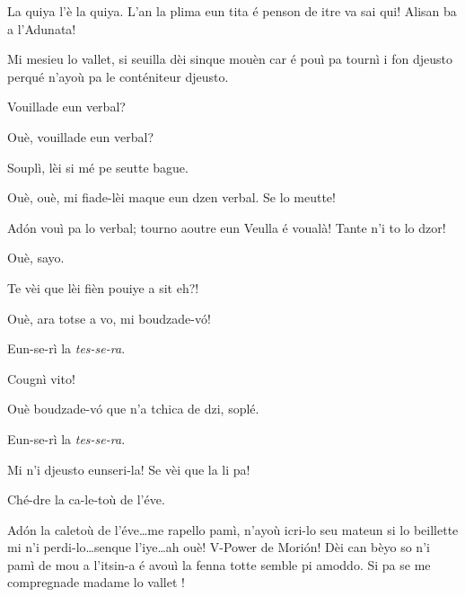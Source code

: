 \begin{drama}

\Prosperospeaks{} La quiya l'è la quiya.  L'an la plima eun tita é penson de itre va sai qui! Alisan ba a l'Adunata!

\Pierluigispeaks Mi mesieu lo vallet, si seuilla dèi sinque mouèn car é pouì pa tournì i fon djeusto perqué n'ayoù pa le conténiteur djeusto.

\Valletspeaks Vouillade eun verbal?

\Prosperospeaks Ouè, vouillade eun verbal?

\Valletspeaks {} Souplì, lèi si mé pe seutte bague.

\Prosperospeaks Ouè, ouè, mi fiade-lèi maque eun dzen verbal. Se lo meutte!

\Pierluigispeaks{} Ad\'on vouì pa lo verbal;  tourno aoutre eun Veulla é voualà! Tante n'i to lo dzor! 

\Valletspeaks Ouè, sayo.


\Prosperospeaks{} Te vèi que lèi fièn pouiye a sit eh?!

\Valletspeaks Ouè, ara totse a vo, mi boudzade-v\'o! 

\Machinaspeaks Eun-se-rì la \textit{tes-se-ra}.

\Prosperospeaks{} Cougnì vito!

\Valletspeaks Ouè boudzade-v\'o que n'a tchica de dzi, soplé.


\Machinaspeaks Eun-se-rì la \textit{tes-se-ra}.

\Prosperospeaks Mi n'i djeusto eunseri-la! Se vèi que la li pa!


\Machinaspeaks Ché-dre la ca-le-toù de l'éve.

\Prosperospeaks{} Ad\'on la caletoù de l'éve\ldots me rapello pamì, n'ayoù icri-lo seu mateun si lo beillette mi n'i perdi-lo\ldots senque l'iye\ldots ah ouè!  V-Power de Mori\'on! Dèi can bèyo so n'i pamì de mou a l'itsin-a é avouì la fenna totte semble pi amoddo. Si pa se me compregnade madame lo vallet \ok !


\end{drama}
